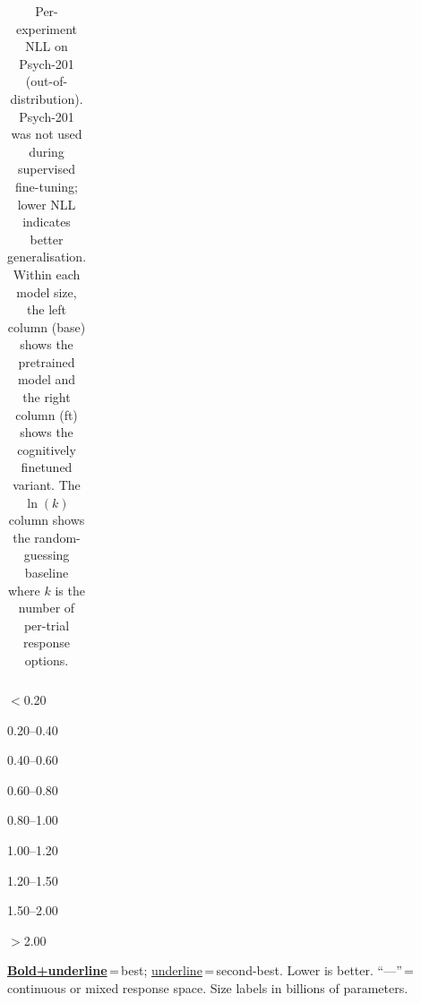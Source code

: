 \begin{table}
{\begin{tabular}{@{}l l  r@{\;\;}r  r@{\;\;}r  r@{\;\;}r  r@{\;\;}r  r@{\;\;}r  r@{\;\;}r  r@{\;\;}r  r@{\;\;}r  r  r@{}}
\bottomrule
\end{tabular}%
}
\vspace{4pt}
\begin{center}\footnotesize
\colorbox{c1!45}{\strut\hspace{5pt}} \scriptsize$<$0.20 \quad
\colorbox{c2!40}{\strut\hspace{5pt}} \scriptsize 0.20--0.40 \quad
\colorbox{c3!40}{\strut\hspace{5pt}} \scriptsize 0.40--0.60 \quad
\colorbox{c4!45}{\strut\hspace{5pt}} \scriptsize 0.60--0.80 \quad
\colorbox{c5!55}{\strut\hspace{5pt}} \scriptsize 0.80--1.00 \quad
\colorbox{c6!50}{\strut\hspace{5pt}} \scriptsize 1.00--1.20 \quad
\colorbox{c7!45}{\strut\hspace{5pt}} \scriptsize 1.20--1.50 \quad
\colorbox{c8!40}{\strut\hspace{5pt}} \scriptsize 1.50--2.00 \quad
\colorbox{c9!35}{\strut\hspace{5pt}} \scriptsize$>$2.00
\end{center}
\vspace{-2pt}
{\tiny \underline{\textbf{Bold+underline}}\,=\,best; \underline{underline}\,=\,second-best. Lower is better. ``---''\,=\,continuous or mixed response space. Size labels in billions of parameters.}
\caption{Per-experiment NLL on Psych-201 (out-of-distribution). Psych-201 was not used during supervised fine-tuning; lower NLL indicates better generalisation. Within each model size, the left column (base) shows the pretrained model and the right column (ft) shows the cognitively finetuned variant. The $\ln(k)$ column shows the random-guessing baseline where $k$ is the number of per-trial response options.}
\label{tab:psych201_appendix_raw}
\end{table}
